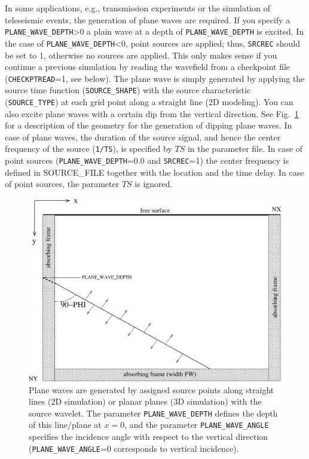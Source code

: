 In some applications, e.g., transmission experiments or the simulation of teleseismic events, the generation of plane waves are required. If you specify a \texttt{PLANE\_WAVE\_DEPTH}>0 a plain wave at a depth of \texttt{PLANE\_WAVE\_DEPTH} is excited. In the case of \texttt{PLANE\_WAVE\_DEPTH}<0, point sources are applied; thus, \texttt{SRCREC} should be set to 1, otherwise no sources are applied. This only makes sense if you continue a previous simulation by reading the wavefield from a checkpoint file (\texttt{CHECKPTREAD}=1, see below). The plane wave is simply generated by applying the source time function (\texttt{SOURCE\_SHAPE}) with the source characteristic (\texttt{SOURCE\_TYPE}) at each grid point along a straight line (2D modeling). You can also excite plane waves with a certain dip from the vertical direction. See Fig.~\ref{fig_plane_wave} for a description of the geometry for the generation of dipping plane waves. In case of plane waves, the duration of the source signal, and hence the center frequency of the source (\texttt{1/TS}), is specified by $TS$ in the parameter file. In case of point sources (\texttt{PLANE\_WAVE\_DEPTH}=0.0 and \texttt{SRCREC}=1) the center frequency is defined in SOURCE\_FILE together with the location and the time delay. In case of point sources, the parameter $TS$ is ignored.
\begin{figure}[ht!]
\centering
    \includegraphics[width=12cm,angle=0]{figures/plane_wave.pdf}
    \caption{Plane waves are generated by assigned source points along  straight lines (2D simulation) or planar planes (3D simulation) with the source wavelet. The parameter \texttt{PLANE\_WAVE\_DEPTH} defines the depth of this line/plane at $x=0$, and the parameter \texttt{PLANE\_WAVE\_ANGLE} specifies the incidence angle with respect to the vertical direction (\texttt{PLANE\_WAVE\_ANGLE}=0 corresponds to vertical incidence).}
    \label{fig_plane_wave}
\end{figure}

